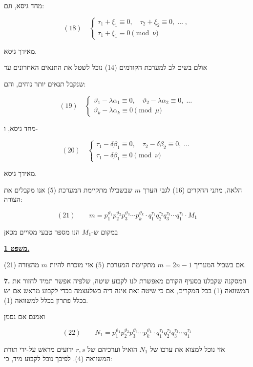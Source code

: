 מחד גיסא, וגם:

\[ (18) \quad
\begin{cases}
\tau_1 + \xi_1 \equiv 0 , \quad \tau_2 + \xi_2 \equiv 0 , \; \ldots \; , \\
\tau_1 + \xi_1 \equiv 0 \pmod{\nu}
\end{cases}
\]

מאידך גיסא.

אולם בשים לב למערכת הקודמים (14) נוכל לשטל את התנאים האחרונים עד

\noindent שנקבל תנאים יותר נוחים, והם:

\[ (19) \quad
\begin{cases}
\vartheta_1 - \lambda\alpha_1 \equiv 0 , \quad \vartheta_2 - \lambda\alpha_2 \equiv 0 , \; \ldots \\
\vartheta_k - \lambda\alpha_k \equiv 0 \pmod{\mu}
\end{cases}
\]

מחד גיסא, ו-

\[ (20) \quad
\begin{cases}
\tau_1 - \delta\beta_1 \equiv 0 , \quad \tau_2 - \delta\beta_2 \equiv 0 , \; \ldots \\
\tau_1 - \delta\beta_1 \equiv 0 \pmod{\nu}
\end{cases}
\]

מאידך גיסא.

הלאה, מתני החקרים (16) לגבי הערך $m$ שבשבילו מתקיימת המערכת (5)
אנו מקבלים את הצורה:

\[ (21) \qquad m = p_1^{\vartheta_1}p_2^{\vartheta_2}p_3^{\vartheta_3}\cdots p_k^{\vartheta_k}
\cdot q_1^{\tau_1}q_2^{\tau_2}q_3^{\tau_3}\cdots q_1^{\tau_1} \cdot M_1 \]

במקום ש-$M_1$ הנו מספר טבעי מסויים מכאן

\noindent\textbf{\underline{משפט 1.}}

אם בשביל המעריך $m = 2n-1$ מתקיימת המערכת (5) אזי מוכרח להיות
$m$ מהצורה (21).

\noindent\textbf{7.} המסקנה שקבלנו בסעיף הקודם מאפשרת לנו לקבוע שיטה, שלפיה אפשר
תמיד לחזור%
את המשוואה (1) בכל המקרים, אם כי שיטה זאת אינה דיה
כשלעצמה בכדי לקבוע מראש אם יש בכלל פתרון בכלל למשוואה (1).

ואמנם אם נסמן

\[ (22) \qquad N_1 = p_1^{\vartheta_1}p_2^{\vartheta_2}p_3^{\vartheta_3}\cdots p_k^{\vartheta_k}
\cdot q_1^{\tau_1}q_2^{\tau_2}q_3^{\tau_3}\cdots q_1^{\tau_1} \]

אזי נוכל למצוא את ערכו של $N_1$ הואיל וערכיהם של $r,s$ ידועים
מראש על-ידי תורת המשוואה (4). לפיכך נוכל לקבוע מיד, כי:

